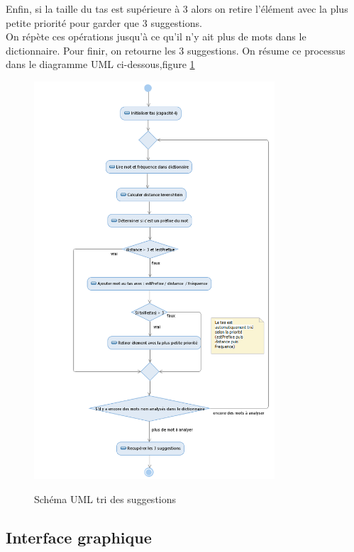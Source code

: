 \documentclass[a4paper, 11pt]{report}
\begin{document}
{Enfin, si la taille du tas est supérieure à 3 alors on retire l'élément avec la plus petite priorité pour garder que 3 suggestions. \\
On répète ces opérations jusqu'à ce qu'il n'y ait plus de mots dans le dictionnaire. Pour finir, on retourne les 3 suggestions. On résume ce processus dans le diagramme UML ci-dessous,figure \ref{fig:uml}\\

\begin{figure}[H]
	\begin{center}
		{\includegraphics[width=0.8\textwidth]{images/uml_algo.png}}
	\end{center}
	\caption{Schéma UML tri des suggestions}
	\label{fig:uml}
\end{figure}

\subsection{Interface graphique}

}
\end{document}
